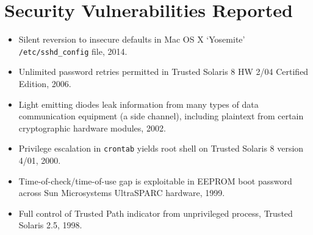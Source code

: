 \section*{Security Vulnerabilities Reported}

\begin{itemize}
    \item Silent reversion to insecure defaults in Mac OS X `Yosemite'
        \texttt{/etc/sshd\_config} file, 2014.\vspace{-2.5mm}
	\item Unlimited password retries permitted in Trusted Solaris 8 HW 2/04
		Certified Edition, 2006.\vspace{-2.5mm}
	\item Light emitting diodes leak information from many types of data
		communication equipment (a side channel), including plaintext from
		certain cryptographic hardware modules, 2002.\vspace{-2.5mm}
	\item Privilege escalation in \verb,crontab, yields root shell on Trusted
		Solaris 8 version 4/01, 2000.\vspace{-2.5mm}
    \item Time-of-check/time-of-use gap is exploitable in EEPROM boot
        password across Sun Microsystems UltraSPARC hardware, 1999.\vspace{-2.5mm}
	\item Full control of Trusted Path indicator from unprivileged process,
		Trusted Solaris 2.5, 1998.\vspace{-2.5mm}
\end{itemize}

